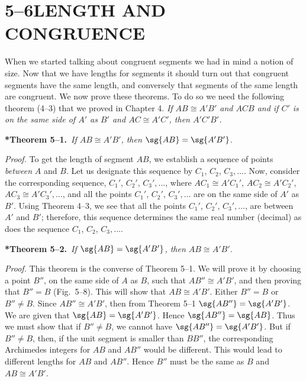 \documentclass[11pt]{book}
\theoremstyle{bkplain}
\theoremstyle{XIplainnote}
\theoremstyle{bkplain}
\theoremstyle{bkplain}
\begin{document}
\section*{5--6\quad LENGTH AND CONGRUENCE}

When we started talking about congruent segments we had in mind a notion of
size. Now that we have lengths for segments it should turn out that congruent
segments have the same length, and conversely that segments of the same length
are congruent. We now prove these theorems. To do so we need the following
theorem (4--3) that we proved in Chapter 4. \emph{If $AB \cong A'B'$ and $ACB$
and if $C'$ is on the same side of $A'$ as $B'$ and $AC \cong A'C'$, then
$A'C'B'$.}

\medskip\noindent
\textbf{*Theorem 5--1.}\ \emph{If $AB \cong A'B'$, then
$\sg{AB} = \sg{A'B'}$.}
\par\medskip

\noindent\emph{Proof.} To get the length of segment $AB$, we establish a
sequence of points \emph{between} $A$ and $B$. Let us designate this sequence
by $C_1$, $C_2$, $C_3,\ldots$. Now, consider the corresponding sequence,
$C_1'$, $C_2'$, $C_3',\ldots$, where $AC_1 \cong A'C_1'$,
$AC_2 \cong A'C_2'$, $AC_3 \cong A'C_3',\ldots$, and all the points $C_1'$,
$C_2'$, $C_3',\ldots$ are on the same side of $A'$ as $B'$. Using Theorem
4--3, we see that all the points $C_1'$, $C_2'$, $C_3',\ldots$, are between
$A'$ and $B'$; therefore, this sequence determines the same real number
(decimal) as does the sequence $C_1$, $C_2$, $C_3,\ldots$.

\medskip\noindent
\textbf{*Theorem 5--2.}\ \emph{If $\sg{AB} = \sg{A'B'}$, then
$AB \cong A'B'$.}
\par\medskip

\noindent\emph{Proof.} This theorem is the converse of Theorem 5--1. We will
prove it by choosing a point $B''$, on the same side of $A$ as $B$, such that
$AB'' \cong A'B'$, and then proving that $B'' = B$ (Fig.~5--8). This will show
that $AB \cong A'B'$. Either $B'' = B$ or $B'' \neq B$. Since
$AB'' \cong A'B'$, then from Theorem 5--1 $\sg{AB''} = \sg{A'B'}$. We are given
that $\sg{AB} = \sg{A'B'}$. Hence $\sg{AB''} = \sg{AB}$. Thus we must show that
if $B'' \neq B$, we cannot have $\sg{AB''} = \sg{A'B'}$. But if $B'' \neq B$,
then, if the unit segment is smaller than $BB''$, the corresponding Archimedes
integers for $AB$ and $AB''$ would be different. This would lead to different
lengths for $AB$ and $AB''$. Hence $B''$ must be the same as $B$ and
$AB \cong A'B'$.
\end{document}
